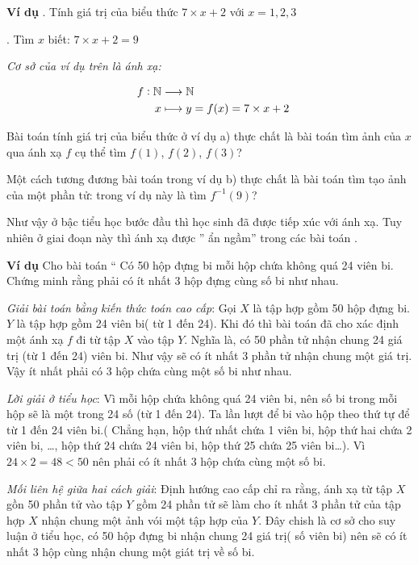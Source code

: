 \documentclass[12pt,oneside,a4paper,reqno]{book}
\begin{document}
 
{\bf Ví dụ}
.	Tính giá trị của biểu thức $7 \times x + 2$ với $x=1,2,3$

. Tìm $x$ biết: $7 \times x+2=9$

\medskip
\textit{Cơ sở của ví dụ trên là ánh xạ:}

\begin{align*}
\text{ \space}f:\mathbb{N}&\longrightarrow\mathbb{N}\\
x&\longmapsto y=f(x)=7 \times x+2
\end{align*}

\medskip
Bài toán tính giá trị của biểu thức ở ví dụ a) thực chất là bài toán tìm ảnh của $x$ qua ánh xạ $f$ cụ thể tìm $f(1)$, $f(2)$, $f(3)$?

Một cách tương đương bài toán trong ví dụ b)  thực chất là bài toán tìm tạo ảnh của một phần tử: trong ví dụ này là tìm $f^{-1} (9)$?

\medskip
        Như vậy ở bậc tiểu học bước đầu thì học sinh đã được tiếp xúc với ánh xạ. Tuy nhiên ở giai đoạn này thì ánh xạ được '' ẩn ngầm'' trong các bài toán .
        
{\bf Ví dụ}
\medskip
Cho bài toán “ Có 50 hộp đựng bi mỗi hộp chứa không quá 24 viên bi. Chứng minh rằng phải có ít nhất 3 hộp đựng cùng số bi như nhau.\\
\medskip

\textit{Giải bài toán bằng kiến thức toán cao cấp}:  Gọi $X$ là tập hợp gồm 50 hộp đựng bi.$Y$ là tập hợp gồm 24 viên bi( từ 1 đến 24). Khi đó thì bài toán đã cho xác định một ánh xạ $f$ đi từ tập $X$ vào tập $Y$. Nghĩa là, có 50 phần tử nhận chung 24 giá trị (từ 1 đến 24) viên bi. Như vậy sẽ có ít nhất 3 phần tử nhận chung một giá trị. Vậy ít nhất phải có 3 hộp chứa cùng một số bi như nhau.

\textit{ Lời giải ở tiểu học}: Vì mỗi hộp chứa không quá 24 viên bi, nên số bi trong mỗi hộp sẽ là một trong 24 số (từ 1 đến 24). Ta lần lượt để bi vào hộp theo thứ tự để từ 1 đến 24 viên bi.( Chẳng hạn, hộp thứ nhất chứa 1 viên bi, hộp thứ hai chứa 2 viên bi, …, hộp thứ 24 chứa 24 viên bi, hộp thứ 25 chứa 25 viên bi…). Vì $24 \times 2=48<50$ nên phải có ít nhất 3 hộp chứa cùng một số bi.

\textit{Mối liên hệ giữa hai cách giải}: Định hướng cao cấp chỉ ra rằng, ánh xạ từ tập $X$ gồn 50 phần tử  vào tập $Y$ gồm 24 phần tử  sẽ làm cho ít nhất 3 phần tử của tập hợp $X$ nhận chung một ảnh vói một tập hợp của $Y$. Đây chish là cơ sở cho suy luận ở tiểu học, có 50 hộp đựng bi nhận chung 24 giá trị( số viên bi) nên sẽ có ít nhất 3 hộp cùng nhận chung một giát trị về số bi.
\end{document}
